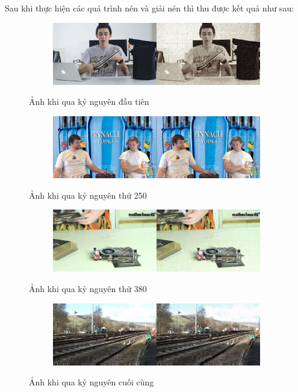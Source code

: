 Sau khi thực hiện các quá trình nén và giải nén thì thu được kết quả như sau:

\begin{figure}
    \begin{subfigure}{1.\textwidth}
        \includegraphics[width=1.\linewidth]{Chapters/items/1_10.png}
        \label{fig: 1epoch}
    \end{subfigure}
    \caption{Ảnh khi qua kỷ nguyên đầu tiên}
\end{figure}

\begin{figure}
    \begin{subfigure}{1.\textwidth}
        \includegraphics[width=1.\linewidth]{Chapters/items/3_30.png}
        \label{fig: 3_30epoch}
    \end{subfigure}
    \caption{Ảnh khi qua kỷ nguyên thứ 250}
\end{figure}

\begin{figure}
    \begin{subfigure}{1.\textwidth}
        \includegraphics[width=1.\linewidth]{Chapters/items/3_100.png}
        \label{fig: 3_100epoch}
    \end{subfigure}
    \caption{Ảnh khi qua kỷ nguyên thứ 380}
\end{figure}

\begin{figure}
    \begin{subfigure}{1.\textwidth}
        \includegraphics[width=1.\linewidth]{Chapters/items/3_140.png}
        \label{fig: 3_140epoch}
    \end{subfigure}
    \caption{Ảnh khi qua kỷ nguyên cuối cùng}
\end{figure}



